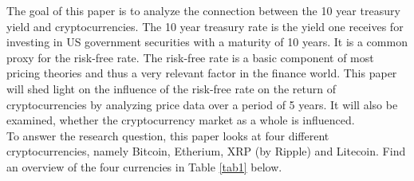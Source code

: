 
The goal of this paper is to analyze the connection between the 10 year treasury yield and cryptocurrencies. The 10 year treasury rate is the yield one receives for investing in US government securities with a maturity of 10 years. It is a common proxy for the risk-free rate. The risk-free rate is a basic component of most pricing theories and thus a very relevant factor in the finance world. This paper will shed light on the influence of the risk-free rate on the return of cryptocurrencies by analyzing price data over a period of 5 years. It will also be examined, whether the cryptocurrency market as a whole is influenced.
\\

To answer the research question, this paper looks at four different cryptocurrencies, namely Bitcoin, Etherium,  XRP (by Ripple) and Litecoin. Find an overview of the four currencies in Table \ref{tab1} below.


